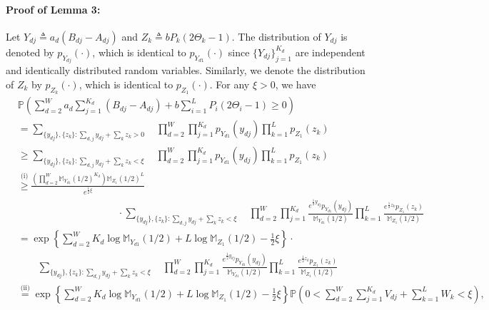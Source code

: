 \documentclass{article}
\begin{document}
\paragraph{Proof of Lemma 3:} 
     Let $Y_{dj} \triangleq a_d ( B_{dj}-A_{dj} )$ and $Z_{k} \triangleq b P_k(2\Theta_k -1)$. The distribution of $Y_{dj}$ is denoted by $p_{Y_{dj}}(\cdot)$, which is identical to $p_{Y_{d1}}(\cdot)$ since $\{Y_{dj}\}_{j=1}^{K_d}$ are independent and identically distributed random variables. Similarly, we denote the distribution of $Z_k$ by $p_{Z_k}(\cdot)$, which is identical to $p_{Z_1}(\cdot)$.  For any $\xi > 0$, we have
	\begin{align*}
		& \mathbb{P} \left( \sum_{d=2}^{W} a_d  \sum_{j=1}^{K_d} (B_{dj} - A_{dj}) + b \sum_{i=1}^{L}P_i(2\Theta_i - 1) \geq 0  \right) \\
		& = \sum_{\{y_{d j}\}, \{z_{k}\}: \sum_{d,j} y_{dj} + \sum_{k} z_k > 0 } \quad \prod_{d=2}^{W} \prod_{j=1}^{K_d} p_{Y_{d1}}(y_{dj}) \prod_{k=1}^{L} p_{Z_1}(z_k) \\
		& \geq \sum_{\{y_{d j}\}, \{z_{k}\}: \sum_{d,j} y_{dj} + \sum_{k} z_k < \xi } \quad \prod_{d=2}^{W} \prod_{j=1}^{K_d} p_{Y_{d1}}(y_{dj}) \prod_{k=1}^{L} p_{Z_1}(z_k) \\
		& \overset{\text{(i)}}{\geq}  \frac{\left(\prod_{d=2}^{W} \mathbb{M}_{Y_{d1}}(1/2)^{K_d}\right) \mathbb{M}_{Z_1}(1/2)^{L} }{e^{\frac{1}{2}\xi}} \\
  & \qquad \qquad \qquad \qquad \qquad \cdot \sum_{\{y_{d j}\}, \{z_{k}\}: \sum_{d,j} y_{dj} + \sum_{k} z_k < \xi } \quad \prod_{d=2}^{W} \prod_{j=1}^{K_d} \frac{e^{\frac{1}{2} y_{dj}} p_{Y_{d1}}(y_{dj})}{\mathbb{M}_{Y_{d1}}(1/2)}  \prod_{k=1}^{L}  \frac{e^{\frac{1}{2} z_k} p_{Z_1}(z_k)}{\mathbb{M}_{Z_1}(1/2)} 
        \end{align*}
        \begin{equation}\label{pl3e1}
            \begin{aligned}
                	& = \exp \left\{ \sum_{d=2}^{W} K_d \log \mathbb{M}_{Y_{d1}}(1/2) + L \log \mathbb{M}_{Z_1}(1/2) - \frac{1}{2} \xi \right\} \cdot \\
		& \quad \quad \sum_{\{y_{d j}\}, \{z_{k}\}: \sum_{d,j} y_{dj} + \sum_{k} z_k < \xi } \quad \prod_{d=2}^{W} \prod_{j=1}^{K_d} \frac{e^{\frac{1}{2} y_{dj}} p_{Y_{d1}}(y_{dj})}{\mathbb{M}_{Y_{d1}}(1/2)}  \prod_{k=1}^{L}  \frac{e^{\frac{1}{2} z_k} p_{Z_1}(z_k)}{\mathbb{M}_{Z_1}(1/2)} \\
		&   \overset{\text{(ii)}}{=} \exp \left\{ \sum_{d=2}^{W} K_d \log \mathbb{M}_{Y_{d1}}(1/2) + L \log \mathbb{M}_{Z_1}(1/2) - \frac{1}{2} \xi \right\} 
		\mathbb{P}\left( 0< \sum_{d=2}^{W} \sum_{j=1}^{K_d} V_{dj} + \sum_{k=1}^{L} W_k < \xi \right), 
            \end{aligned}
        \end{equation}
\end{document}

